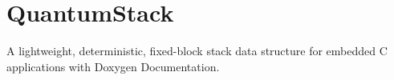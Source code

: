 \chapter{Quantum\+Stack}
\hypertarget{md_README}{}\label{md_README}
\label{md_README_autotoc_md0}%
%
A lightweight, deterministic, fixed-\/block stack data structure for embedded C applications with Doxygen Documentation. 